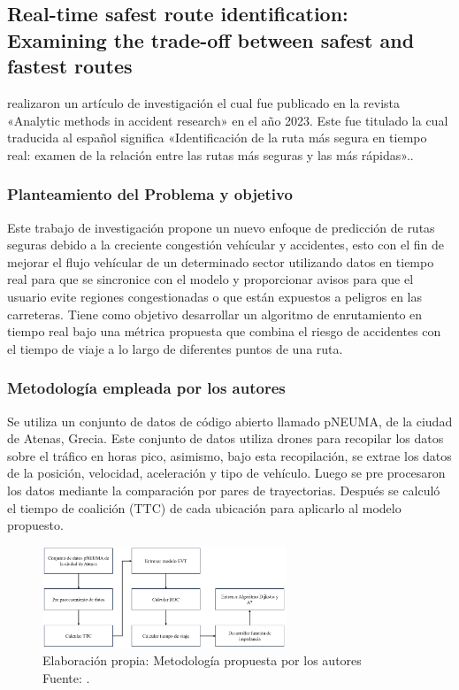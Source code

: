 \subsection{Real-time safest route identification: Examining the trade-off between safest and fastest routes \citep*{pr_Ghoul}}
\citeauthor{pr_Ghoul} realizaron un artículo de investigación el cual fue publicado en la revista «Analytic methods in accident research» en el año 2023. Este fue titulado  la cual traducida al español significa «Identificación de la ruta más segura en tiempo real: examen de la relación entre las rutas más seguras y las más rápidas»..

\subsubsection{Planteamiento del Problema y objetivo }
Este trabajo de investigación propone un nuevo enfoque de predicción de rutas seguras debido a la creciente congestión vehícular y accidentes, esto con el fin de mejorar el flujo vehícular  de un determinado sector utilizando datos en tiempo real para que se sincronice con el modelo y proporcionar avisos para que el usuario evite regiones congestionadas o que están expuestos a peligros en las carreteras. Tiene como objetivo desarrollar un algoritmo de enrutamiento en tiempo real bajo una métrica propuesta que combina el riesgo de accidentes con el tiempo de viaje a lo largo de diferentes puntos de una ruta.

\subsubsection{Metodología empleada por los autores}
Se utiliza un conjunto de datos de código abierto llamado pNEUMA, de la ciudad de Atenas, Grecia. Este conjunto de datos utiliza drones para recopilar los datos sobre el tráfico en horas pico, asimismo, bajo esta recopilación, se extrae los datos de la posición, velocidad, aceleración y tipo de vehículo. Luego se pre procesaron los datos mediante la comparación por pares de trayectorias. Después se calculó el tiempo de coalición (TTC) de cada ubicación para aplicarlo al modelo propuesto.
\begin{figure}[h]
	\begin{center}
		\includegraphics[width=0.65\textwidth]{2/figures/AtenaMetodo.jpg}
		\caption{Elaboración propia: Metodología propuesta por los autores \\
			Fuente: \citep*{pr_Ghoul}. }
		\label{1:fig2}
	\end{center}
\end{figure}

